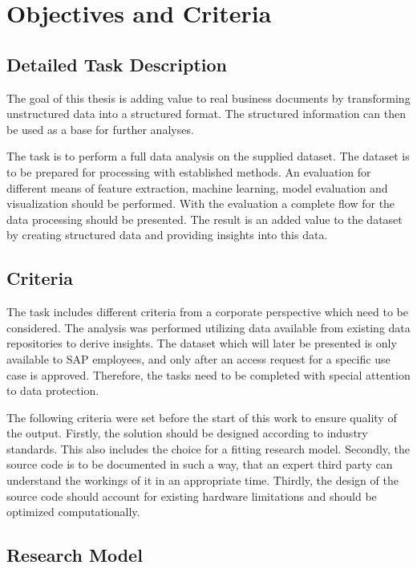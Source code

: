 \chapter{Objectives and Criteria}
\section{Detailed Task Description}
\label{section:detailed-task}
The goal of this thesis is adding value to real business documents by transforming unstructured data into a structured format. The structured information can then be used as a base for further analyses. 

The task is to perform a full data analysis on the supplied dataset. The dataset is to be prepared for processing with established methods. An evaluation for different means of feature extraction, machine learning, model evaluation and visualization should be performed. With the evaluation a complete flow for the data processing should be presented. The result is an added value to the dataset by creating structured data and providing insights into this data.

\section{Criteria}
\label{section:criteria}
The task includes different criteria from a corporate perspective which need to be considered. The analysis was performed utilizing data available from existing data repositories to derive insights. The dataset which will later be presented is only available to SAP employees, and only after an access request for a specific use case is approved. Therefore, the tasks need to be completed with special attention to data protection. 

The following criteria were set before the start of this work to ensure quality of the output. Firstly, the solution should be designed according to industry standards. This also includes the choice for a fitting research model. Secondly, the source code is to be documented in such a way, that an expert third party can understand the workings of it in an appropriate time. Thirdly, the design of the source code should account for existing hardware limitations and should be optimized computationally.

\label{research-model}
\section{Research Model}

